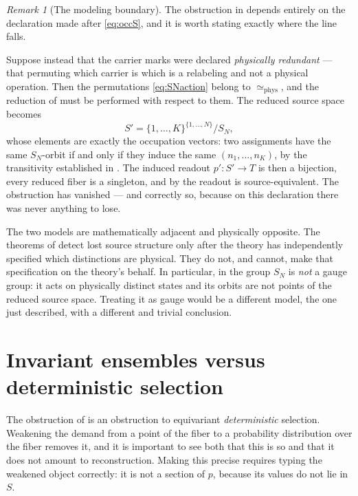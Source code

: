 \documentclass[11pt,reqno]{amsart}
\theoremstyle{plain}
\theoremstyle{definition}
\theoremstyle{remark}
\newtheorem{remark}[theorem]{Remark}
\newcommand{\phe}{\simeq_{\mathrm{phys}}}
\begin{document}
\begin{remark}[The modeling boundary]
\label{rem:boundary}
The obstruction in  depends entirely on the declaration made after \eqref{eq:occS}, and it is worth stating exactly where the line falls.

Suppose instead that the carrier marks were declared \emph{physically redundant} --- that permuting which carrier is which is a relabeling and not a physical operation. Then the permutations \eqref{eq:SNaction} belong to $\phe$, and the reduction of  must be performed with respect to them. The reduced source space becomes
\[
S'=\{1,\ldots,K\}^{\{1,\ldots,N\}}\big/ S_{N},
\]
whose elements are exactly the occupation vectors: two assignments have the same $S_{N}$-orbit if and only if they induce the same $(n_{1},\ldots,n_{K})$, by the transitivity established in . The induced readout $p'\colon S'\to T$ is then a bijection, every reduced fiber is a singleton, and by  the readout is source-equivalent. The obstruction has vanished --- and correctly so, because on this declaration there was never anything to lose.

The two models are mathematically adjacent and physically opposite. The theorems of  detect lost source structure only after the theory has independently specified which distinctions are physical. They do not, and cannot, make that specification on the theory's behalf. In particular, in  the group $S_{N}$ is \emph{not} a gauge group: it acts on physically distinct states and its orbits are not points of the reduced source space. Treating it as gauge would be a different model, the one just described, with a different and trivial conclusion.
\end{remark}

\section{Invariant ensembles versus deterministic selection}
\label{sec:probabilistic}

The obstruction of  is an obstruction to equivariant \emph{deterministic} selection. Weakening the demand from a point of the fiber to a probability distribution over the fiber removes it, and it is important to see both that this is so and that it does not amount to reconstruction. Making this precise requires typing the weakened object correctly: it is not a section of $p$, because its values do not lie in $S$.
\end{document}
